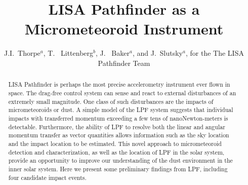 \documentclass[a4paper]{jpconf}
\begin{document}
\title{LISA Pathfinder as a Micrometeoroid Instrument}

\author{
J.I.~Thorpe$^{a}$,
T. ~Littenberg$^{b}$,
J. ~Baker$^{a}$,
and J.~Slutsky$^{a}$,
for the The LISA Pathfinder Team
}
\address{$^{s}$ NASA Goddard Space Flight Center, 8800 Greenbelt Road, Greenbelt, MD 20771, USA}
\address{$^{u}$ NASA Marshall Space Flight Center, Redstone Arsenal, Huntsville, AL 35812, USA}



\begin{abstract}
LISA Pathfinder is perhaps the most precise accelerometry instrument ever flown in space. The drag-free control system can sense and react to external disturbances of an extremely small magnitude. One class of such disturbances are the impacts of micrometeoroids or dust. A simple model of the LPF system suggests that individual impacts with transferred momentum exceeding a few tens of nanoNewton-meters is detectable. Furthermore, the ability of LPF to resolve both the linear and angular momentum transfer as vector quantities allows information such as the sky location and the impact location to be estimated. This novel approach to micrometeoroid detection and characterization, as well as the location of LPF in the solar system, provide an opportunity to improve our understanding of the dust environment in the inner solar system. Here we present some preliminary findings from LPF, including four candidate impact events.
\end{abstract}

\end{document}
